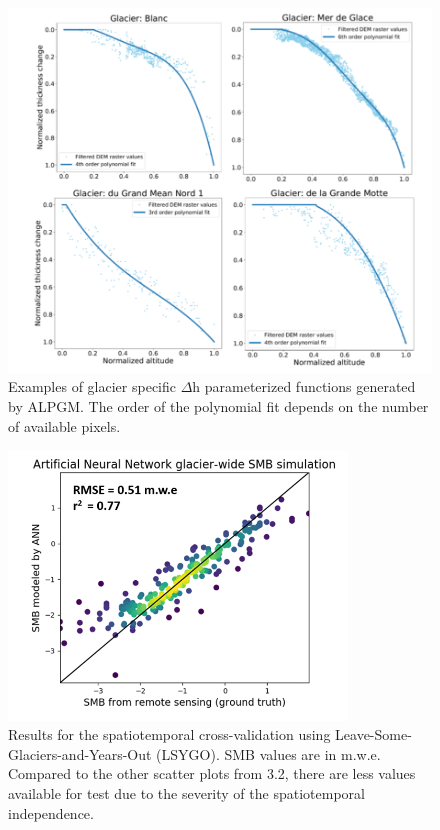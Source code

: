 \begin{figure}[h]
\centering
\includegraphics[width=14cm]{Figures/methods/Figure_S3.png}
\caption{Examples of glacier specific $\Delta$h parameterized functions generated by ALPGM. The order of the polynomial fit depends on the number of available pixels.}
\end{figure}

\begin{figure}[h]
\centering
\includegraphics[width=9cm]{Figures/methods/Figure_S4.png}
\caption{Results for the spatiotemporal cross-validation using Leave-Some-Glaciers-and-Years-Out (LSYGO). SMB values are in m.w.e. Compared to the other scatter plots from 3.2, there are less values available for test due to the severity of the spatiotemporal independence. }
\end{figure}

